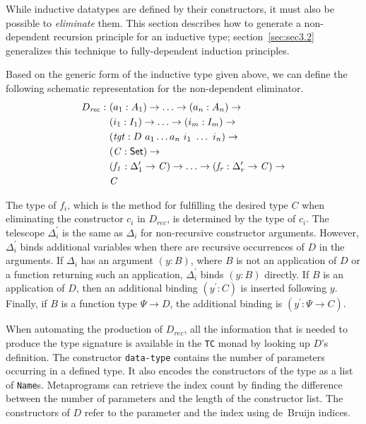 \documentclass[sigplan,10pt]{acmart}
\begin{document}

While inductive datatypes are defined by their constructors, it must also be possible to \emph{eliminate} them. This section describes how to generate a non-dependent recursion principle for an inductive type; section~\ref{sec:sec3.2} generalizes this technique to fully-dependent induction principles.

Based on the generic form of the inductive type given above, we can define the following schematic representation for the non-dependent eliminator.
\begin{align*}
D_{\mathit{rec}} :\ & (a_1 : A_1) \to \ldots \to (a_n : A_n) \to\\
& (i_1 : I_1) \to \ldots \to (i_m : I_m) \to\\
& (\mathit{tgt} : D\ a_1 \ldots a_n\ i_1\ \ldots\ i_n) \to\\
& (\mathit{C} : \textsf{Set}{}) \to \\
& (\mathit{f_1} : \Delta_1^\prime \to \mathit{C}) \to \ldots \to (\mathit{f_r} : \Delta_r^\prime \to \mathit{C}) \to \\
& \mathit{C}
\end{align*}

The type of $f_i$, which is the method for fulfilling the desired type $C$ when eliminating the constructor $c_i$ in $D_\mathit{rec}$, is determined by the type of $c_i$.
The telescope $\Delta_i^\prime$ is the same as $\Delta_i$ for non-recursive constructor arguments.
However, $\Delta_i^\prime$ binds additional variables when there are recursive occurrences of $D$ in the arguments.
If $\Delta_i$ has an argument $(y : B)$, where $B$ is not an application of $D$ or a function returning such an application, $\Delta_i^\prime$ binds $(y : B)$ directly.
If $B$ is an application of $D$, then an additional binding $(y^\prime : C)$ is inserted following $y$.
Finally, if $B$ is a function type $\Psi \to D$, the additional binding is $(y^\prime : \Psi \to C)$. 

When automating the production of $D_{\mathit{rec}}$, all the information that is needed to produce the type signature is available in the \texttt{TC} monad by looking up $D$'s definition.
The constructor {\tt data-type} contains the number of parameters occurring in a defined type. It also encodes the constructors of the type as a list of \texttt{Name}s. Metaprograms can retrieve the index count by finding the difference between the number of parameters and the length of the constructor list. The constructors of $D$ refer to the parameter and the index using de~Bruijn indices.
\end{document}
